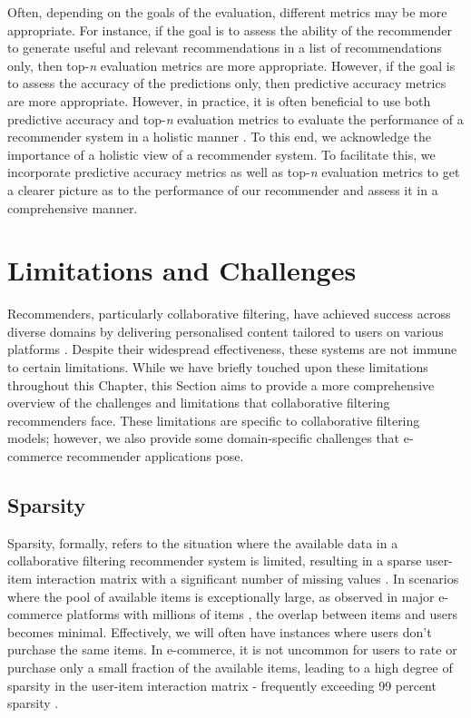 Often, depending on the goals of the evaluation, different metrics may be more appropriate. For instance, if the goal is to assess the ability of the recommender to generate useful and relevant recommendations in a list of recommendations only, then top-\textit{n} evaluation metrics are more appropriate. However, if the goal is to assess the accuracy of the predictions only, then predictive accuracy metrics are more appropriate. However, in practice, it is often beneficial to use both predictive accuracy and top-\textit{n} evaluation metrics to evaluate the performance of a recommender system in a holistic manner \cite{zangerle2022evaluating}. To this end, we acknowledge the importance of a holistic view of a recommender system. To facilitate this, we incorporate predictive accuracy metrics as well as top-\textit{n} evaluation metrics to get a clearer picture as to the performance of our recommender and assess it in a comprehensive manner.

\section{Limitations and Challenges}
\label{sec:2 Limitations and Challenges}

Recommenders, particularly collaborative filtering, have achieved success across diverse domains by delivering personalised content tailored to users on various platforms \cite{chen2012critiquing}. Despite their widespread effectiveness, these systems are not immune to certain limitations. While we have briefly touched upon these limitations throughout this Chapter, this Section aims to provide a more comprehensive overview of the challenges and limitations that collaborative filtering recommenders face. These limitations are specific to collaborative filtering models; however, we also provide some domain-specific challenges that e-commerce recommender applications pose. 

\subsection{Sparsity}
\label{subsec:2 Sparsity}

Sparsity, formally, refers to the situation where the available data in a collaborative filtering recommender system is limited, resulting in a sparse user-item interaction matrix with a significant number of missing values \cite{huang2004applying}. In scenarios where the pool of available items is exceptionally large, as observed in major e-commerce platforms with millions of items \cite{ghani2002building}, the overlap between items and users becomes minimal. Effectively, we will often have instances where users don't purchase the same items. In e-commerce, it is not uncommon for users to rate or purchase only a small fraction of the available items, leading to a high degree of sparsity in the user-item interaction matrix - frequently exceeding 99 percent sparsity \cite{ghani2002building}. 

